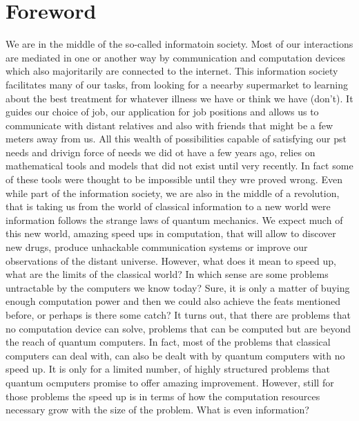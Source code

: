 \chapter*{Foreword}
We are in the middle of the so-called informatoin society. Most of our interactions are mediated in one or another way by communication and computation devices which also majoritarily are connected to the internet. This information society facilitates many of our tasks, from looking for a neearby supermarket to learning about the best treatment for whatever illness we have or think we have (don't). It guides our choice of job, our application for job positions and allows us to communicate with distant relatives and also with friends that might be a few meters away from us. All this wealth of possibilities capable of satisfying our pst needs and drivign force of needs we did ot have a few years ago, relies on mathematical tools and models that did not exist until very recently. In fact some of these tools were thought to be impossible until they wre proved wrong. Even while part of the information society, we are also in the middle of a revolution, that is taking us from the world of classical information to a new world were information follows the strange laws of quantum mechanics. We expect much of this new world, amazing speed ups in computation, that will allow to discover new drugs, produce unhackable communication systems or improve our observations of the distant universe. However, what does it mean to speed up, what are the limits of the classical world? In which sense are some problems untractable by the computers we know today? Sure, it is only a matter of buying enough computation power and then we could also achieve the feats mentioned before, or perhaps is there some catch? It turns out, that there are problems that no computation device can solve, problems that can be computed but are beyond the reach of quantum computers. In fact, most of the problems that classical computers can deal with, can also be dealt with by quantum computers with no speed up. It is only for a limited number, of highly structured problems that quantum ocmputers promise to offer amazing improvement. However, still for those problems the speed up is in terms of how the computation resources necessary grow with the size of the problem. What is even information?


